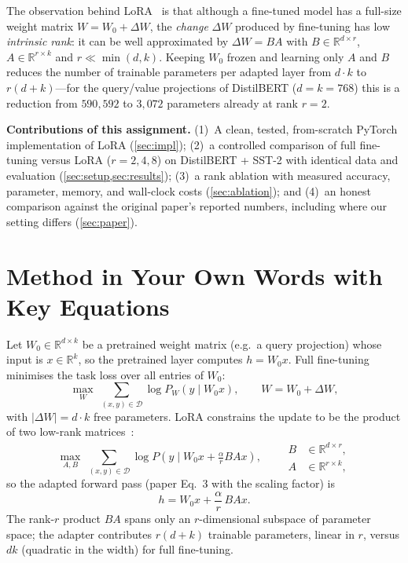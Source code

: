 \documentclass[conference]{IEEEtran}
\begin{document}
The observation behind LoRA~\cite{hu2022lora} is that although a fine-tuned
model has a full-size weight matrix $W = W_0 + \Delta W$, the \emph{change}
$\Delta W$ produced by fine-tuning has low \emph{intrinsic rank}: it can be
well approximated by $\Delta W = BA$ with $B\in\mathbb{R}^{d\times r}$,
$A\in\mathbb{R}^{r\times k}$ and $r \ll \min(d,k)$. Keeping $W_0$ frozen and
learning only $A$ and $B$ reduces the number of trainable parameters per
adapted layer from $d\cdot k$ to $r(d+k)$---for the query/value projections of
DistilBERT ($d=k=768$) this is a reduction from $590{,}592$ to $3{,}072$
parameters already at rank $r{=}2$.

\textbf{Contributions of this assignment.}
(1)~A clean, tested, from-scratch PyTorch implementation of LoRA
(\cref{sec:impl}); (2)~a controlled comparison of full fine-tuning versus LoRA
($r=2,4,8$) on DistilBERT + SST-2 with identical data and evaluation
(\cref{sec:setup,sec:results}); (3)~a rank ablation with measured accuracy,
parameter, memory, and wall-clock costs (\cref{sec:ablation}); and (4)~an
honest comparison against the original paper's reported numbers, including
where our setting differs (\cref{sec:paper}).

\section{Method in Your Own Words with Key Equations}
\label{sec:method}
Let $W_0\in\mathbb{R}^{d\times k}$ be a pretrained weight matrix (e.g.\ a query
projection) whose input is $x\in\mathbb{R}^{k}$, so the pretrained layer
computes $h = W_0 x$. Full fine-tuning minimises the task loss over all entries
of $W_0$:
\begin{equation}
\max_W \; \sum_{(x,y)\in\mathcal{D}} \log P_W(y \mid W_0 x),
\qquad W = W_0 + \Delta W,
\label{eq:full}
\end{equation}
with $|\Delta W| = d\cdot k$ free parameters. LoRA constrains the update to be
the product of two low-rank matrices~\cite{hu2022lora}:
\begin{equation}
\max_{A,B} \; \sum_{(x,y)\in\mathcal{D}} \log P(y \mid W_0 x + \tfrac{\alpha}{r} B A x),
\qquad
\begin{aligned}
B &\in \mathbb{R}^{d\times r},\\
A &\in \mathbb{R}^{r\times k},
\end{aligned}
\label{eq:lora}
\end{equation}
so the adapted forward pass (paper Eq.~3 with the scaling factor) is
\begin{equation}
h = W_0 x + \frac{\alpha}{r}\, B A x .
\label{eq:forward}
\end{equation}
The rank-$r$ product $BA$ spans only an $r$-dimensional subspace of parameter
space; the adapter contributes $r(d+k)$ trainable parameters, linear in $r$,
versus $dk$ (quadratic in the width) for full fine-tuning.
\end{document}
